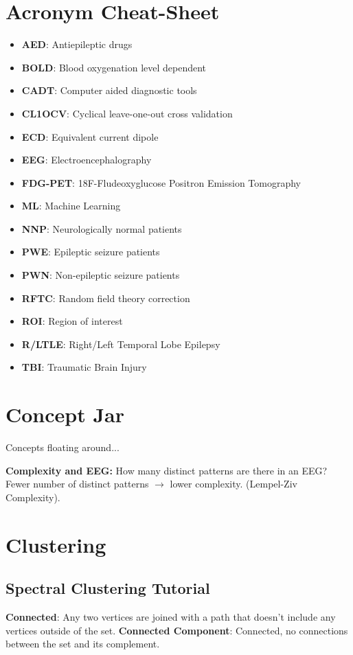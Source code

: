 \documentclass{article}
\begin{document}
    \section{Acronym Cheat-Sheet}
        \begin{itemize}
            \item \textbf{AED}: Antiepileptic drugs
            \item \textbf{BOLD}: Blood oxygenation level dependent
            \item \textbf{CADT}: Computer aided diagnostic tools
            \item \textbf{CL1OCV}: Cyclical leave-one-out cross validation
            \item \textbf{ECD}: Equivalent current dipole
            \item \textbf{EEG}: Electroencephalography
            \item \textbf{FDG-PET}: 18F-Fludeoxyglucose Positron Emission 
Tomography
            \item \textbf{ML}: Machine Learning
            \item \textbf{NNP}: Neurologically normal patients
            \item \textbf{PWE}: Epileptic seizure patients
            \item \textbf{PWN}: Non-epileptic seizure patients
            \item \textbf{RFTC}: Random field theory correction
            \item \textbf{ROI}: Region of interest
            \item \textbf{R/LTLE}: Right/Left Temporal Lobe Epilepsy
            \item \textbf{TBI}: Traumatic Brain Injury
        \end{itemize}

    \section{Concept Jar}
        Concepts floating around...

        \textbf{Complexity and EEG:} How many distinct patterns are there in an 
EEG?
        Fewer number of distinct patterns \ensuremath{\rightarrow} lower 
complexity.
        (Lempel-Ziv Complexity).


    \section{Clustering}
        \subsection{Spectral Clustering Tutorial}
        \textbf{Connected}: Any two vertices are joined with a path that doesn't
include any vertices outside of the set.
        \textbf{Connected Component}: Connected, no connections between the set and
its complement. 
\end{document}
